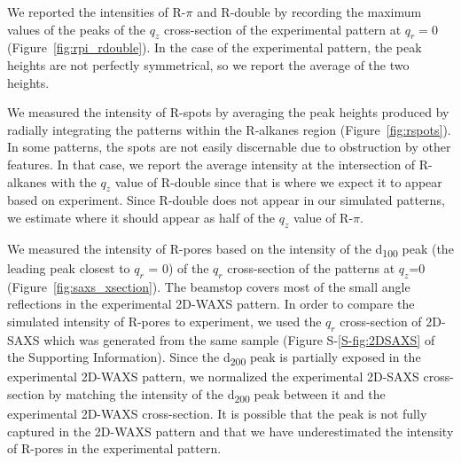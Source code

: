 \documentclass[journal=jpcbfk,manuscript=article]{achemso}
\begin{document}

  We reported the intensities of R-$\pi$ and R-double by recording the maximum values
  of the peaks of the $q_z$ cross-section of the experimental pattern at $q_r=0$ 
  (Figure~\ref{fig:rpi_rdouble}). In the case of the experimental pattern, the peak
  heights are not perfectly symmetrical, so we report the average of the two heights.

  We measured the intensity of R-spots by averaging the peak heights produced
  by radially integrating the patterns within the R-alkanes region
  (Figure~\ref{fig:rspots}). In some patterns, the spots are not easily
  discernable due to obstruction by other features. In that case, we report the
  average intensity at the intersection of R-alkanes with the $q_z$ value of
  R-double since that is where we expect it to appear based on experiment. Since
  R-double does not appear in our simulated patterns, we estimate where it should
  appear as half of the $q_z$ value of R-$\pi$.


  We measured the intensity of R-pores based on the intensity of the
  d\textsubscript{100} peak (the leading peak closest to $q_r$ = 0) of the $q_r$
  cross-section of the patterns at $q_z$=0 (Figure~\ref{fig:saxs_xsection}). The
  beamstop covers most of the small angle reflections in the experimental 2D-WAXS
  pattern. In order to compare the simulated intensity of R-pores to experiment,
  we used the $q_r$ cross-section of 2D-SAXS which was generated from the same
  sample (Figure S-\ref{S-fig:2DSAXS} of the Supporting Information). Since the d\textsubscript{200} peak is
  partially exposed in the experimental 2D-WAXS pattern, we normalized the
  experimental 2D-SAXS cross-section by matching the intensity of the
  d\textsubscript{200} peak between it and the experimental 2D-WAXS
  cross-section. It is possible that the peak is not fully captured in the 2D-WAXS
  pattern and that we have underestimated the intensity of R-pores in the
  experimental pattern.     
\end{document}
